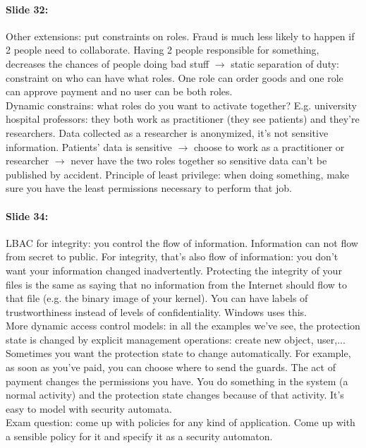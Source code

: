 \documentclass[10pt,a4paper]{report}
\begin{document}
\paragraph{Slide 32:} Other extensions: put constraints on roles. Fraud is much less likely to happen if 2 people need to collaborate. Having 2 people responsible for something, decreases the chances of people doing bad stuff $\rightarrow$ static separation of duty: constraint on who can have what roles. One role can order goods and one role can approve payment and no user can be both roles. \\
Dynamic constrains: what roles do you want to activate together? E.g. university hospital professors: they both work as practitioner (they see patients) and they're researchers. Data collected as a researcher is anonymized, it's not sensitive information. Patients' data is sensitive $\rightarrow$ choose to work as a practitioner or researcher $\rightarrow$ never have the two roles together so sensitive data can't be published by accident. Principle of least privilege: when doing something, make sure you have the least permissions necessary to perform that job. 

\paragraph{Slide 34:} LBAC for integrity: you control the flow of information. Information can not flow from secret to public. For integrity, that's also flow of information: you don't want your information changed inadvertently. Protecting the integrity of your files is the same as saying that no information from the Internet should flow to that file (e.g. the binary image of your kernel). You can have labels of trustworthiness instead of levels of confidentiality. Windows uses this. \\
More dynamic access control models: in all the examples we've see, the protection state is changed by explicit management operations: create new object, user,... Sometimes you want the protection state to change automatically. For example, as soon as you've paid, you can choose where to send the guards. The act of payment changes the permissions you have. You do something in the system (a normal activity) and the protection state changes because of that activity. It's easy to model with security automata.\\
Exam question: come up with policies for any kind of application. Come up with a sensible policy for it and specify it as a security automaton.
\end{document}
